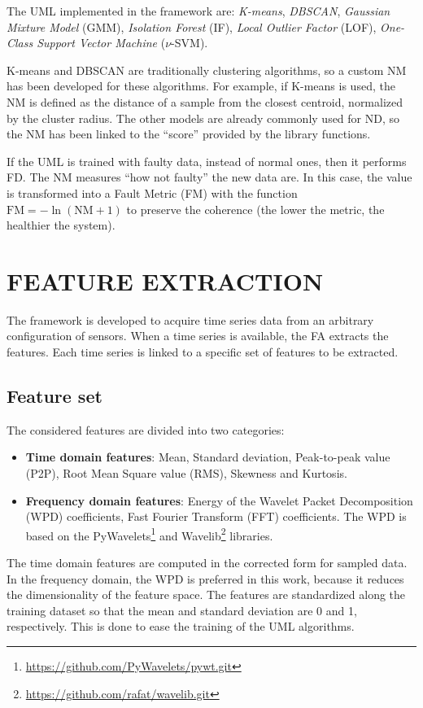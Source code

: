 \documentclass[a4paper, 10pt, conference, oneside]{ieeeconf}
\newcommand{\quoted}[1]{``#1''}
\begin{document}
The UML implemented in the framework are: \emph{K-means}, \emph{DBSCAN}, \emph{Gaussian Mixture Model} (GMM), \emph{Isolation Forest} (IF), \emph{Local Outlier Factor} (LOF), \emph{One-Class Support Vector Machine} ($\nu$-SVM).

K-means and DBSCAN are traditionally clustering algorithms, so a custom NM has been developed for these algorithms. For example, if K-means is used, the NM is defined as the distance of a sample from the closest centroid, normalized by the cluster radius. The other models are already commonly used for ND, so the NM has been linked to the \quoted{score} provided by the library functions.

If the UML is trained with faulty data, instead of normal ones, then it performs FD. The NM measures \quoted{how not faulty} the new data are. In this case, the value is transformed into a Fault Metric (FM) with the function $\text{FM} = - \ln(\text{NM} + 1)$ to preserve the coherence (the lower the metric, the healthier the system).  \section{FEATURE EXTRACTION}
The framework is developed to acquire time series data from an arbitrary configuration of sensors. When a time series is available, the FA extracts the features. Each time series is linked to a specific set of features to be extracted.

\subsection{Feature set}
The considered features are divided into two categories:
\begin{itemize}
    \item \textbf{Time domain features}: Mean, Standard deviation, Peak-to-peak value (P2P), Root Mean Square value (RMS), Skewness and Kurtosis.
    \item \textbf{Frequency domain features}: Energy of the Wavelet Packet Decomposition (WPD) coefficients, Fast Fourier Transform (FFT) coefficients. The WPD is based on the PyWavelets\footnote{\url{https://github.com/PyWavelets/pywt.git}} and Wavelib\footnote{\url{https://github.com/rafat/wavelib.git}} libraries.
\end{itemize}

The time domain features are computed in the corrected form for sampled data. In the frequency domain, the WPD is preferred in this work, because it reduces the dimensionality of the feature space. The features are standardized along the training dataset so that the mean and standard deviation are 0 and 1, respectively. This is done to ease the training of the UML algorithms.
\end{document}
